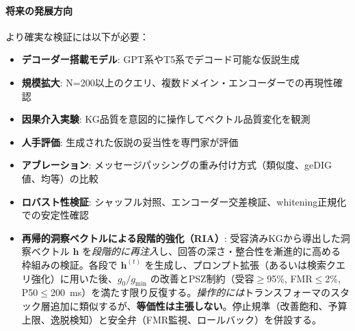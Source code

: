 \documentclass[ja=standard,xelatex]{bxjsarticle}
\begin{document}
\paragraph{将来の発展方向}
より確実な検証には以下が必要：
\begin{itemize}
  \item \textbf{デコーダー搭載モデル}: GPT系やT5系でデコード可能な仮説生成
  \item \textbf{規模拡大}: N=200以上のクエリ、複数ドメイン・エンコーダーでの再現性確認
  \item \textbf{因果介入実験}: KG品質を意図的に操作してベクトル品質変化を観測
  \item \textbf{人手評価}: 生成された仮説の妥当性を専門家が評価
  \item \textbf{アブレーション}: メッセージパッシングの重み付け方式（類似度、geDIG値、均等）の比較
  \item \textbf{ロバスト性検証}: シャッフル対照、エンコーダー交差検証、whitening正規化での安定性確認
  \item \textbf{再帰的洞察ベクトルによる段階的強化（RIA）}: 受容済みKGから導出した洞察ベクトル $\mathbf{h}$ を\emph{段階的に再注入}し、回答の深さ・整合性を漸進的に高める枠組みの検証。各段で $\mathbf{h}^{(t)}$ を生成し、プロンプト拡張（あるいは検索クエリ強化）に用いた後、$g_0/g_{\min}$ の改善とPSZ制約（受容$\ge$95\%, FMR$\le$2\%, P50$\le$\SI{200}{ms}）を満たす限り反復する。\emph{操作的には}トランスフォーマのスタック層追加に類似するが、\textbf{等価性は主張しない}。停止規準（改善飽和、予算上限、逸脱検知）と安全弁（FMR監視、ロールバック）を併設する。
\end{itemize}
\end{document}
